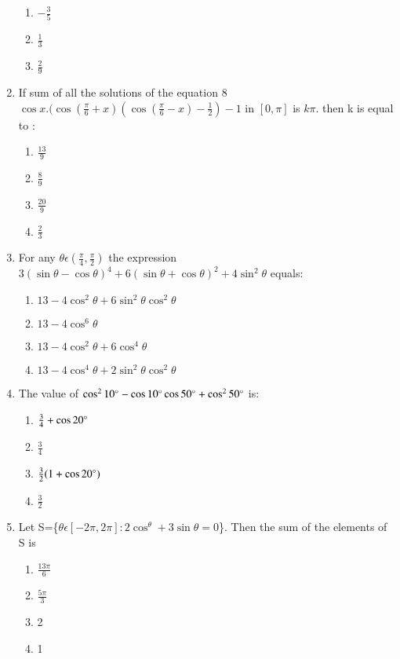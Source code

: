 \begin{enumerate}[label=\arabic*.,ref=\thesubsection.\theenumi]
\begin{enumerate}
        \item {$-\frac{3}{5}$}
        \item {$\frac{1}{3}$}
        \item {$\frac{2}{9}$}
    \end{enumerate}
    \item If sum of all the solutions of the equation 8 $\cos x.(\cos({\frac{\pi}{6}}+ x)(\cos({\frac{\pi}{6}}- x)-{\frac{1}{2}}) -1 $ in $[0 , \pi]$ is $k\pi$. then k is equal to :
    \begin{enumerate}
        \item {$\frac{13}{9}$}
        \item {$\frac{8}{9}$}
        \item {$\frac{20}{9}$}
        \item {$\frac{2}{3}$}
    \end{enumerate}
    \item For any $\theta \epsilon ({\frac{\pi}{4}},{\frac{\pi}{2}})$ the expression $3(\sin\theta - \cos\theta)^4 + 6(\sin\theta + \cos \theta)^2 + 4 \sin^2\theta$ equals:
    \begin{enumerate}
        \item $13- 4\cos^2\theta+6\sin^2\theta\cos^2\theta$
        \item $13- 4\cos^6\theta$
        \item $13- 4\cos^2\theta+6\cos^4\theta$
        \item $13- 4\cos^4\theta+2\sin^2\theta\cos^2\theta$
    \end{enumerate}
    \item The value of $\cos^2 10\degree- \cos10\degree\cos 50\degree + \cos^2 50\degree$ is:
    \begin{enumerate}
        \item ${\frac{3}{4}}+ \cos 20\degree$
        \item ${\frac{3}{4}}$
        \item ${\frac{3}{2}}(1+ \cos 20\degree)$
        \item ${\frac{3}{2}}$
    \end{enumerate}
    \item Let S=\{$\theta \epsilon [-2\pi,2\pi]: 2\cos^\theta+3\sin\theta =0$\}. Then the sum of the elements of S is 
    \begin{enumerate}
        \item ${\frac{13\pi}{6}}$
        \item ${\frac{5\pi}{3}}$
        \item 2
        \item 1

\end{enumerate}
\end{enumerate}
